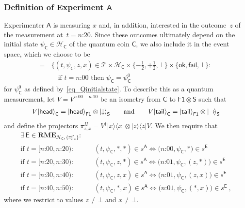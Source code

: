 \documentclass[12pt]{article}
\theoremstyle{plain}
\theoremstyle{definition}
\newcommand*{\cH}{\mathcal{H}}
\newcommand*{\cT}{\mathcal{T}}
\newcommand*{\ket}[1]{{| #1 \rangle}}
\newcommand{\proj}[1]{|#1\rangle\!\langle #1|}
\newcommand*{\Exp}{\mathsf{E}}
\newcommand*{\Friendone}{\mathsf{F1}}
\newcommand*{\Assistant}{\mathsf{A}}
\newcommand*{\Spin}{\mathsf{S}}
\newcommand*{\Coin}{\mathsf{C}}
\newcommand*{\RME}{\mathbf{RME}}
\newcommand*{\spindown}{\ket{{\hspace{-0.1ex}\downarrow\hspace{-0.1ex}}}}
\newcommand*{\spinright}{\ket{{\hspace{-0.2ex}\rightarrow\hspace{-0.4ex}}}}
\newcommand*{\sminus}{{\textstyle - \frac{1}{2}}}
\newcommand*{\splus}{{\textstyle + \frac{1}{2}}}
\newcommand*{\ok}{\mathsf{ok}}
\newcommand*{\fail}{\mathsf{fail}}
\newcommand*{\head}{\mathsf{head}}
\newcommand*{\tail}{\mathsf{tail}}
\begin{document}
\subsubsection*{Definition of Experiment $\Assistant$}

Experimenter $\Assistant$ is measuring $x$ and, in addition, interested in the outcome~$z$ of the measurement at~$t = \text{$n$:20}$. Since these outcomes ultimately depend on the initial state $\psi_{\Coin} \in \cH_{\Coin}$ of the quantum coin $\Coin$, we also include it in the event space, which we choose to be
\begin{align}
    [\Assistant]  = \, & \bigl\{(t, \psi_{\Coin}, z, x) \in \cT \times \cH_\Coin\times \{\sminus, \splus, \bot\} \times \{\ok, \fail, \bot\} : \, \nonumber  \\ & \quad \text{if } t = \text{$n$:00} \text{ then } \psi_{\Coin} = \psi_{\Coin}^0  \label{eq_Assistantpsi} 
\end{align}
for $\psi^0_{\Coin}$ as defined by~\eqref{eq_Qinitialstate}. To describe this as a quantum measurement, let $V = V^{\text{$n$:00} - \text{$n$:10}}$ be an isometry from $\Coin$ to $\Friendone \otimes \Spin$  such that
\begin{align*}
  V \ket{\head}_\Coin =  \ket{\head}_{\Friendone} \otimes \spindown_{\Spin} \qquad \text{and} \qquad
  V\ket{\tail}_\Coin = \ket{\tail}_{\Friendone} \otimes \spinright_{\Spin} 
\end{align*}
and define the projectors $\pi^H_{z, x} = V^{\dagger} \proj{x} \otimes \proj{z} V$. We then require that
  \begin{align} \label{eq_AssistantM}
  \exists \,  \Exp \in \RME_{\cH_{\Coin}, \{\pi^H_{z,x}\}} : & \\
  \text{if $t = [\text{$n$:00}, \text{$n$:20}$)} : & \quad  (t, \psi_\Coin, *, *) \in s^{\Assistant} \iff \bigl(\text{$n$:00}, \psi_{\Coin}, * \bigr) \in s^{\Exp} \nonumber \\
    \text{if $t = [\text{$n$:20}, \text{$n$:30}$)} : & \quad  (t, \psi_\Coin, z, *) \in s^{\Assistant} \iff \bigl(\text{$n$:01}, \psi_{\Coin}, (z,*) \bigr) \in s^{\Exp}  \nonumber \\
    \text{if $t = [\text{$n$:30}, \text{$n$:40}$)} : & \quad  (t, \psi_\Coin, z, x) \in s^{\Assistant} \iff \bigl(\text{$n$:01}, \psi_{\Coin}, (z, x)\bigr) \in s^{\Exp} \nonumber \\
    \text{if $t = [\text{$n$:40}, \text{$n$:50}$)} : & \quad  (t, \psi_\Coin, *, x) \in s^{\Assistant} \iff \bigl(\text{$n$:01}, \psi_{\Coin}, (*, x)\bigr) \in s^{\Exp} \nonumber \ ,
\end{align}
 where we restrict to values $z \neq \bot$ and $x \neq \bot$.
\end{document}
